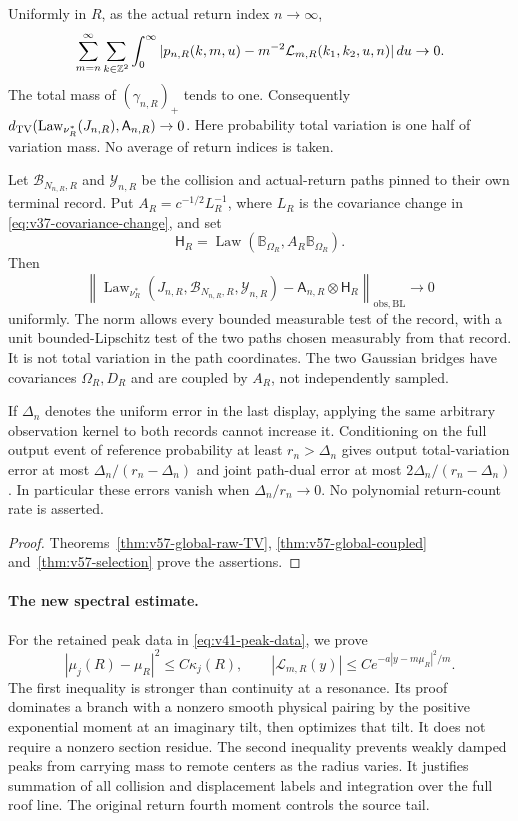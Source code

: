 \clearpage
\begin{leadtheorem}
\label{thm:intro-v57-global}
Uniformly in $R$, as the actual return index $n\to\infty$,
\[
 \sum_{m=n}^\infty\sum_{k\in\mathbb Z^2}\int_0^\infty
   |p_{n,R}(k,m,u)-m^{-2}\mathcal L_{m,R}(k_1,k_2,u,n)|\,du\to0.
\]
The total mass of $(\gamma_{n,R})_+$ tends to one. Consequently
$d_{\rm TV}(\operatorname{Law}_{\nu_R^*}(J_{n,R}),\mathsf A_{n,R})\to0$.
Here probability total variation is one half of variation mass.
No average of return indices is taken.

Let $\mathcal B_{N_{n,R},R}$ and $\mathcal Y_{n,R}$ be the collision
and actual-return paths pinned to their own terminal record. Put
$A_R=c^{-1/2}L_R^{-1}$, where $L_R$ is the covariance change in
\eqref{eq:v37-covariance-change}, and set
\[
 \mathsf H_R=\operatorname{Law}(\mathbb B_{\Omega_R},
                                      A_R\mathbb B_{\Omega_R}).
\]
Then
\[
 \left\|\operatorname{Law}_{\nu_R^*}
  (J_{n,R},\mathcal B_{N_{n,R},R},\mathcal Y_{n,R})
                 -\mathsf A_{n,R}\otimes\mathsf H_R
       \right\|_{\mathrm{obs},\mathrm{BL}}\to0
\]
uniformly. The norm allows every bounded measurable test of the record,
with a unit bounded-Lipschitz test of the two paths chosen measurably
from that record. It is not total variation in the path coordinates.
The two Gaussian bridges have covariances $\Omega_R,D_R$ and are
coupled by $A_R$, not independently sampled.

If $\Delta_n$ denotes the uniform error in the last display, applying
the same arbitrary observation kernel to both records cannot increase
it. Conditioning on the full output event of reference probability at
least $r_n>\Delta_n$ gives output total-variation error at most
$\Delta_n/(r_n-\Delta_n)$ and joint path-dual error at most
$2\Delta_n/(r_n-\Delta_n)$. In particular these errors vanish when
$\Delta_n/r_n\to0$. No polynomial return-count rate is asserted.
\end{leadtheorem}
\begin{proof}
Theorems~\ref{thm:v57-global-raw-TV}, \ref{thm:v57-global-coupled}
and~\ref{thm:v57-selection} prove the assertions.
\end{proof}

\paragraph{The new spectral estimate.}
For the retained peak data in \eqref{eq:v41-peak-data}, we prove
\[
 |\mu_j(R)-\mu_R|^2\le C\kappa_j(R),\qquad
 |\mathcal L_{m,R}(y)|\le C e^{-a|y-m\mu_R|^2/m}.
\]
The first inequality is stronger than continuity at a resonance. Its
proof dominates a branch with a nonzero smooth physical pairing by the
positive exponential moment at an imaginary tilt, then optimizes that
tilt. It does not require a nonzero section residue. The second
inequality prevents weakly damped peaks from carrying mass to remote
centers as the radius varies. It justifies summation of all collision
and displacement labels and integration over the full roof line.
The original return fourth moment controls the source tail.

